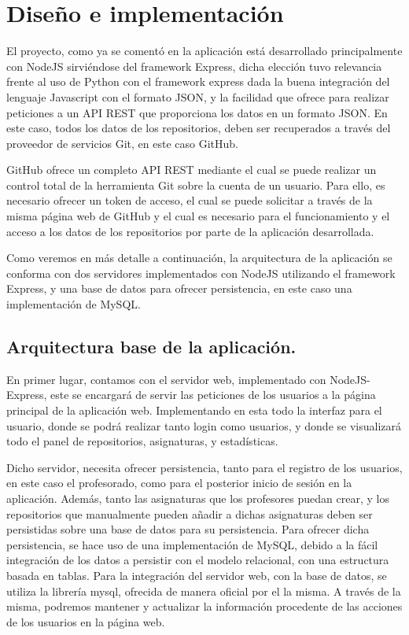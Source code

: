 \chapter{Diseño e implementación\label{05disenoTrabajo}}

El proyecto, como ya se comentó en la aplicación está desarrollado principalmente con NodeJS sirviéndose del framework Express, dicha elección tuvo relevancia frente al uso de Python con el framework express dada la buena integración del lenguaje Javascript con el formato JSON, y la facilidad que ofrece para realizar peticiones a un API REST que proporciona los datos en un formato JSON. En este caso, todos los datos de los repositorios, deben ser recuperados a través del proveedor de servicios Git, en este caso GitHub.

GitHub ofrece un completo API REST mediante el cual se puede realizar un control total de la herramienta Git sobre la cuenta de un usuario. Para ello, es necesario ofrecer un token de acceso, el cual se puede solicitar a través de la misma página web de GitHub y el cual es necesario para el funcionamiento y el acceso a los datos de los repositorios por parte de la aplicación desarrollada.

Como veremos en más detalle a continuación, la arquitectura de la aplicación se conforma con dos servidores implementados con NodeJS utilizando el framework Express, y una base de datos para ofrecer persistencia, en este caso una implementación de MySQL.




\section{Arquitectura base de la aplicación.}
En primer lugar, contamos con el servidor web, implementado con NodeJS-Express, este se encargará de servir las peticiones de los usuarios a la página principal de la aplicación web. Implementando en esta todo la interfaz para el usuario, donde se podrá realizar tanto login como usuarios, y donde se visualizará todo el panel de repositorios, asignaturas, y estadísticas.

Dicho servidor, necesita ofrecer persistencia, tanto para el registro de los usuarios, en este caso el profesorado,  como para el posterior inicio de sesión en la aplicación. Además, tanto las asignaturas que los profesores puedan crear, y los repositorios que manualmente pueden añadir a dichas asignaturas deben ser persistidas sobre una base de datos para su persistencia.
Para ofrecer dicha persistencia, se hace uso de una implementación de MySQL, debido a la fácil integración de los datos a persistir con el modelo relacional, con una estructura basada en tablas. Para la integración del servidor web, con la base de datos, se utiliza la librería mysql, ofrecida de manera oficial por el la misma. A través de la misma, podremos mantener y actualizar la información procedente de las acciones de los usuarios en la página web.

